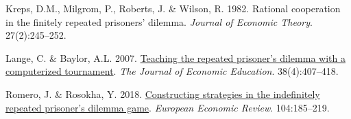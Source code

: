 \documentclass[11pt,preprint]{elsarticle}
\numberwithin{equation}{section}
\numberwithin{figure}{section}
\numberwithin{table}{section}
\newlength{\cslhangindent}
\newenvironment{CSLReferences}[2] %
{\begin{list}{}{%
	\setlength{\itemindent}{0pt}
	\setlength{\leftmargin}{0pt}
	\setlength{\parsep}{0pt}
	\ifodd #1
	\setlength{\leftmargin}{\cslhangindent}
	\setlength{\itemindent}{-1\cslhangindent}
	\fi
	\setlength{\itemsep}{#2\baselineskip}}}
{\end{list}}
\begin{document}
\begin{CSLReferences}{1}{1}
Kreps, D.M., Milgrom, P., Roberts, J. \& Wilson, R. 1982. Rational
cooperation in the finitely repeated prisoners' dilemma. \emph{Journal
of Economic Theory}. 27(2):245--252.

Lange, C. \& Baylor, A.L. 2007.
\href{https://doi.org/10.3200/JECE.38.4.407-418}{Teaching the repeated
prisoner's dilemma with a computerized tournament}. \emph{The Journal of
Economic Education}. 38(4):407--418.

Romero, J. \& Rosokha, Y. 2018.
\href{https://doi.org/10.1016/j.euroecorev.2018.02.008}{Constructing
strategies in the indefinitely repeated prisoner's dilemma game}.
\emph{European Economic Review}. 104:185--219.

\end{CSLReferences}


\end{document}
